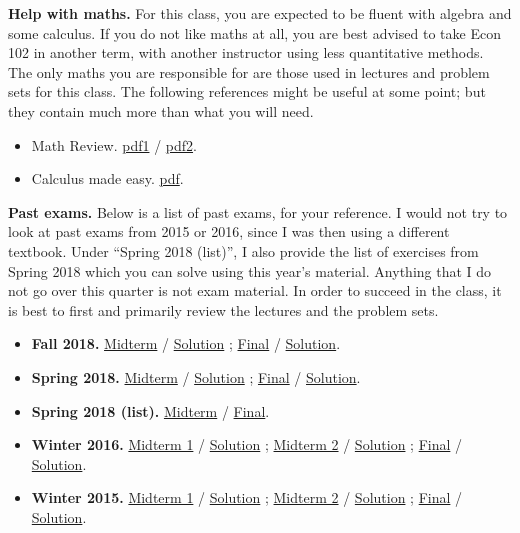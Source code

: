 \documentclass[]{book}
\providecommand{\tightlist}{%
  \setlength{\itemsep}{0pt}\setlength{\parskip}{0pt}}
\begin{document}
\textbf{Help with maths.} For this class, you are expected to be fluent
with algebra and some calculus. If you do not like maths at all, you are
best advised to take Econ 102 in another term, with another instructor
using less quantitative methods. The only maths you are responsible for
are those used in lectures and problem sets for this class. The
following references might be useful at some point; but they contain
much more than what you will need.

\begin{itemize}
\tightlist
\item
  Math Review. \href{old/calculus-review.pdf}{pdf1} /
  \href{old/calculus-review2.pdf}{pdf2}.
\item
  Calculus made easy.
  \href{http://djm.cc/library/Calculus_Made_Easy_Thompson.pdf}{pdf}.
\end{itemize}

\textbf{Past exams.} Below is a list of past exams, for your reference.
I would not try to look at past exams from 2015 or 2016, since I was
then using a different textbook. Under ``Spring 2018 (list)'', I also
provide the list of exercises from Spring 2018 which you can solve using
this year's material. Anything that I do not go over this quarter is not
exam material. In order to succeed in the class, it is best to first and
primarily review the lectures and the problem sets.

\begin{itemize}
\tightlist
\item
  \textbf{Fall 2018.} \href{past-exams/2018F-midterm.pdf}{Midterm} /
  \href{past-exams/2018F-midterm-solution.pdf}{Solution} ;
  \href{past-exams/2018F-final.pdf}{Final} /
  \href{past-exams/2018F-final-solution.pdf}{Solution}.
\item
  \textbf{Spring 2018.} \href{past-exams/2018S-midterm.pdf}{Midterm} /
  \href{past-exams/2018S-midterm-solution.pdf}{Solution} ;
  \href{past-exams/2018S-final.pdf}{Final} /
  \href{past-exams/2018S-final-solution.pdf}{Solution}.
\item
  \textbf{Spring 2018 (list).} \href{past-exams/midterm.pdf}{Midterm} /
  \href{past-exams/final.pdf}{Final}.
\item
  \textbf{Winter 2016.} \href{past-exams/2016W-midterm1.pdf}{Midterm 1}
  / \href{past-exams/2016W-midterm1-solution.pdf}{Solution} ;
  \href{past-exams/2016W-midterm2.pdf}{Midterm 2} /
  \href{past-exams/2016W-midterm2-solution.pdf}{Solution} ;
  \href{past-exams/2016W-final.pdf}{Final} /
  \href{past-exams/2016W-final-solution.pdf}{Solution}.
\item
  \textbf{Winter 2015.} \href{past-exams/2015W-midterm1.pdf}{Midterm 1}
  / \href{past-exams/2015W-midterm1-solution.pdf}{Solution} ;
  \href{past-exams/2015W-midterm2.pdf}{Midterm 2} /
  \href{past-exams/2015W-midterm2-solution.pdf}{Solution} ;
  \href{past-exams/2015W-final.pdf}{Final} /
  \href{past-exams/2015W-final-solution.pdf}{Solution}.
\end{itemize}
\end{document}
